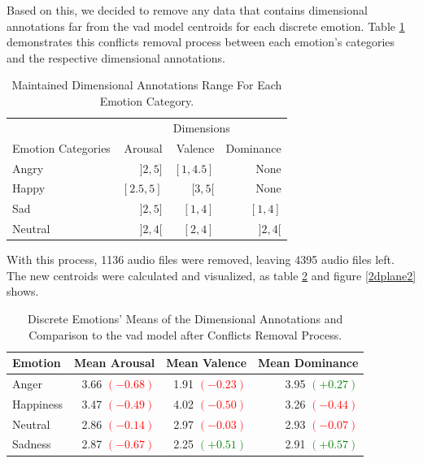 Based on this, we decided to remove any data that contains dimensional annotations far from the \ac{vad} model centroids for each discrete emotion. Table \ref{tab:conf} demonstrates this conflicts removal process between each emotion's categories and the respective dimensional annotations.

\begin{table}[H]
\caption{Maintained Dimensional Annotations Range For Each Emotion Category.}
\label{tab:conf}
\centering
    \begin{tabular}{lrrr}
        \toprule
        {} & \multicolumn{3}{c}{Dimensions} \\ \cmidrule{2-4}
        Emotion Categories &    Arousal &      Valence &       Dominance \\
        \midrule
        Angry   &   $]2, 5]$  	& $[1, 4.5]$ 	&  None 		\\
        Happy 	&   $[2.5, 5]$  & $[3, 5[$ 		&  None 		\\
        Sad    	&   $]2, 5]$ 	& $[1, 4]$ 		&  $[1, 4]$ 	\\
        Neutral &   $]2, 4[$	& $[2, 4]$ 		&  $]2, 4[$		\\
        \bottomrule
    \end{tabular}
\end{table}


With this process, 1136 audio files were removed, leaving 4395 audio files left. The new centroids were calculated and visualized, as table \ref{tab:new_c} and figure \ref{2dplane2} shows.


\begin{table}[H]
	\centering
	\caption{Discrete Emotions' Means of the Dimensional Annotations and Comparison to the \ac{vad} model after Conflicts Removal Process.}
	\label{tab:new_c}
	\begin{tabular}{lrrr}
		\toprule
		Emotion & Mean Arousal &   Mean Valence & Mean Dominance \\
		\midrule
		Anger   	&   3.66 \textcolor{red}{$(-0.68)$} &  1.91 \textcolor{red}{$(-0.23)$} &  3.95 \textcolor{green}{$(+0.27)$} \\
		Happiness   &   3.47 \textcolor{red}{$(-0.49)$} &  4.02 \textcolor{red}{$(-0.50)$} &  3.26 \textcolor{red}{$(-0.44)$} \\
		Neutral 	&   2.86 \textcolor{red}{$(-0.14)$} &  2.97 \textcolor{red}{$(-0.03)$} &  2.93 \textcolor{red}{$(-0.07)$} \\
		Sadness     &   2.87 \textcolor{red}{$(-0.67)$} &  2.25 \textcolor{green}{$(+0.51)$} &  2.91 \textcolor{green}{$(+0.57)$} \\
		\bottomrule
	\end{tabular}
\end{table}


